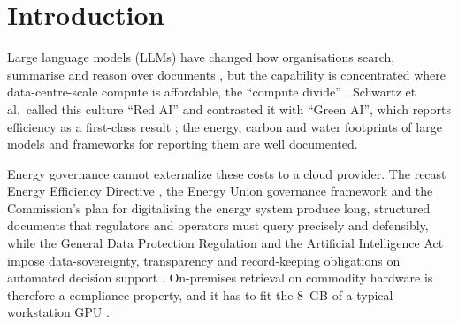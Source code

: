 \documentclass[pdflatex,sn-mathphys-num]{sn-jnl}
\theoremstyle{thmstyleone}%
\theoremstyle{thmstylethree}%
\begin{document}

\maketitle

\section{Introduction}\label{sec:intro}

Large language models (LLMs) have changed how organisations search, summarise and reason over documents \cite{bengioetal2003,zhu2025informationretrieval}, but the capability is concentrated where data-centre-scale compute is affordable, the ``compute divide'' \cite{besiroglu2024computedividemachinelearning,sevilla2022compute,thompson2020computational,hooker2021hardware}. Schwartz et al.\ called this culture ``Red AI'' and contrasted it with ``Green AI'', which reports efficiency as a first-class result \cite{schwartz2020green}; the energy, carbon and water footprints of large models \cite{strubell2019energycost,patterson2021carbon,Luccioni_2024,li2025makingaithirstyuncovering,devries2023growing,wu2022sustainable} and frameworks for reporting them \cite{henderson2020systematic,lacoste2019quantifyingcarbonemissionsmachine,lannelongue2021green,tabbakh2024GreenAI} are well documented.

Energy governance cannot externalize these costs to a cloud provider. The recast Energy Efficiency Directive \cite{eueed2023}, the Energy Union governance framework \cite{eugovernance2018} and the Commission's plan for digitalising the energy system \cite{eu2022digitalising} produce long, structured documents that regulators and operators must query precisely and defensibly, while the General Data Protection Regulation \cite{gdpr2016} and the Artificial Intelligence Act \cite{euaiact2024} impose data-sovereignty, transparency and record-keeping obligations on automated decision support \cite{jorgensen2025aidecisionsupport}. On-premises retrieval on commodity hardware is therefore a compliance property, and it has to fit the 8\, GB of a typical workstation GPU \cite{zhou2019edge}.
\end{document}
